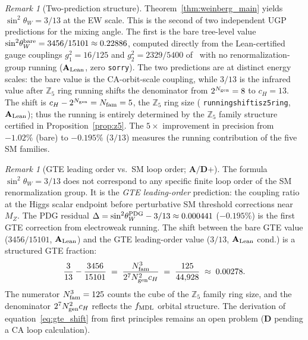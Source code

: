\documentclass[11pt]{article}
\theoremstyle{remark}
\newtheorem{remark}[theorem]{Remark}
\newcommand{\Ngen}{N_{\rm gen}}
\newcommand{\Nfam}{N_{\rm fam}}
\newcommand{\cH}{c_H}
\newcommand{\lean}[1]{%
  \penalty-100
  \begingroup\def\_{\textunderscore\allowbreak}\texttt{#1}\endgroup}
\newcommand{\sinwsq}{\sin^2\!\theta_W}
\newcommand{\CatAL}{\ensuremath{\textbf{A}_{\rm Lean}}}
\newcommand{\CatAD}{\textbf{A/D}}
\newcommand{\CatD}{\textbf{D}}
\begin{document}
\begin{remark}[Two-prediction structure]
\label{rem:two_predictions}
Theorem~\ref{thm:weinberg_main} yields $\sinwsq = 3/13$ at the EW scale.
This is the second of two independent UGP predictions for the mixing angle.
The first is the bare tree-level value $\sinwsq^{\rm bare} = 3456/15101 \approx 0.22886$,
computed directly from the Lean-certified gauge couplings
$g_1^2 = 16/125$ and $g_2^2 = 2329/5400$ of~\cite{Spivack2026_SM_UGP}
with no renormalization-group running ($\CatAL$, zero \texttt{sorry}).
The two predictions are at distinct energy scales: the bare value is the CA-orbit-scale
coupling, while $3/13$ is the infrared value after $\mathbb{Z}_5$ ring running shifts
the denominator from $2^{\Ngen} = 8$ to $\cH = 13$.
The shift is $\cH - 2^{\Ngen} = \Nfam = 5$, the $\mathbb{Z}_5$ ring size
(\lean{running\_shift\_is\_z5\_ring}, $\CatAL$); thus the running is entirely determined
by the $\mathbb{Z}_5$ family structure certified in Proposition~\ref{prop:z5}.
The $5\times$ improvement in precision from $-1.02\%$ (bare) to $-0.195\%$ ($3/13$)
measures the running contribution of the five SM families.
\end{remark}

\begin{remark}[GTE leading order vs.\ SM loop order; $\CatAD$+]
\label{rem:gte_loop_order}
The formula $\sinwsq = 3/13$ does not correspond to any specific finite loop order
of the SM renormalization group.
It is the \emph{GTE leading-order} prediction: the coupling ratio at the Higgs scalar
endpoint before perturbative SM threshold corrections near $M_Z$.
The PDG residual $\Delta = \sinwsq^{\rm PDG} - 3/13 \approx 0.000441$ ($-0.195\%$)
is the first GTE correction from electroweak running.
The shift between the bare GTE value ($3456/15101$, $\CatAL$) and the GTE
leading-order value ($3/13$, $\CatAL$ cond.) is a structured GTE fraction:
\begin{equation}
  \frac{3}{13} - \frac{3456}{15101}
  \;=\; \frac{\Nfam^3}{2^7 \Ngen^2 \cH}
  \;=\; \frac{125}{44{,}928}
  \;\approx\; 0.00278.
  \label{eq:gte_shift}
\end{equation}
The numerator $\Nfam^3 = 125$ counts the cube of the $\mathbb{Z}_5$ family ring
size, and the denominator $2^7 \Ngen^2 \cH$ reflects the $f_{\rm MDL}$ orbital
structure.
The derivation of equation~\eqref{eq:gte_shift} from first principles remains an
open problem ($\CatD$ pending a CA loop calculation).
\end{remark}
\end{document}
